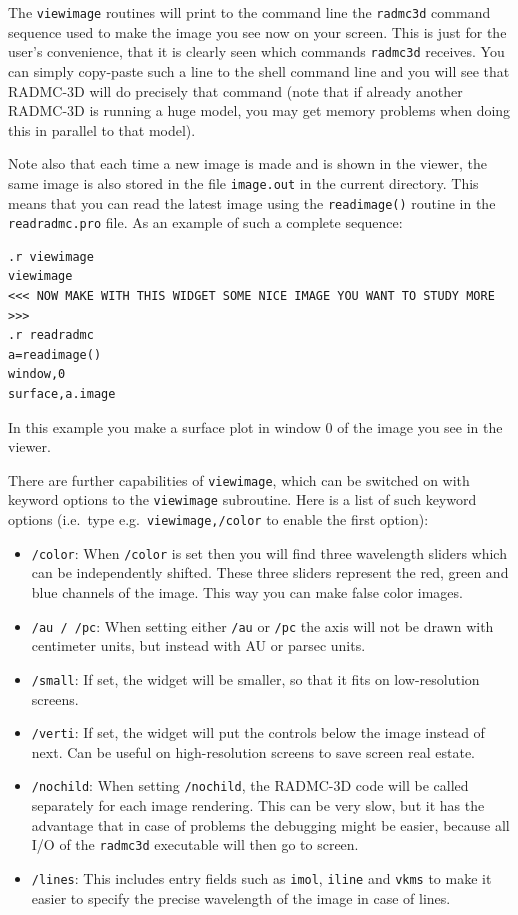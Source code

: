 \documentclass{report}
\newenvironment{asciibox}%
  {\begin{list}{}{%
    \setlength{\topsep}{0.5em}%
    \setlength{\parskip}{0em}%
    \setlength{\parsep}{0em}%
    \setlength{\itemsep}{0em}%
    \setlength{\rightmargin}{0em}%
    \setlength{\leftmargin}{3.0em}%
    \setlength{\labelsep}{1em}%
    \setlength{\labelwidth}{2em}%
  }\normalfont\footnotesize\item}
  {\end{list}}
\begin{document}
The {\small\tt viewimage} routines will print to the command line the {\small\tt radmc3d} 
command sequence used to make the image you see now on your screen. This is
just for the user's convenience, that it is clearly seen which commands
{\small\tt radmc3d} receives. You can simply copy-paste such a line to the
shell command line and you will see that RADMC-3D will do precisely that
command (note that if already another RADMC-3D is running a huge model,
you may get memory problems when doing this in parallel to that model). 

Note also that each time a new image is made and is shown in the viewer, the
same image is also stored in the file {\small\tt image.out} in the current
directory. This means that you can read the latest image using the
{\small\tt readimage()} routine in the {\small\tt readradmc.pro} file. As
an example of such a complete sequence:
\begin{asciibox}\begin{verbatim}
.r viewimage
viewimage
<<< NOW MAKE WITH THIS WIDGET SOME NICE IMAGE YOU WANT TO STUDY MORE >>> 
.r readradmc
a=readimage()
window,0
surface,a.image
\end{verbatim}\end{asciibox}
In this example you make a surface plot in window 0 of the image you see in
the viewer.

There are further capabilities of {\small\tt viewimage}, which can be switched
on with keyword options to the {\small\tt viewimage} subroutine. Here is a list
of such keyword options (i.e.\ type e.g.\ {\small\tt viewimage,/color} to 
enable the first option):
\begin{itemize}
\item[] {\small\tt /color}: When {\small\tt /color} is set then you will find three
  wavelength sliders which can be independently shifted. These three sliders
  represent the red, green and blue channels of the image. This way you
  can make false color images.
\item[] {\small\tt /au / /pc}: When setting either {\small\tt /au} or {\small\tt /pc} the axis
  will not be drawn with centimeter units, but instead with AU or parsec
  units.
\item[] {\small\tt /small}: If set, the widget will be smaller, so that it fits
  on low-resolution screens.
\item[] {\small\tt /verti}: If set, the widget will put the controls below the
  image instead of next. Can be useful on high-resolution screens to save
  screen real estate.
\item[] {\small\tt /nochild}: When setting {\small\tt /nochild}, the RADMC-3D code will
  be called separately for each image rendering. This can be very slow, but
  it has the advantage that in case of problems the debugging might be
  easier, because all I/O of the {\small\tt radmc3d} executable will then go to
  screen.
\item[] {\small\tt /lines}: This includes entry fields such as {\small\tt imol},
  {\small\tt iline} and {\small\tt vkms} to make it easier to specify the 
  precise wavelength of the image in case of lines.
\end{itemize}
\end{document}
